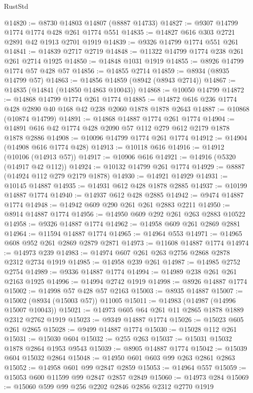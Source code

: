 \begin{lexlean}{RustStd}
\begin{coremodule}
@14820 := @8730 @14803 @14807 (@8887 @14733)
@14827 := @9307 @14799 @1774 @1774 @428 @261 @1774 @551
@14835 := @14827 @616 @303 @2721 @2891 @42 @1913 @2701 @1919
@14839 := @9326 @14799 @1774 @551 @261
@14841 := @14839 @2717 @2719
@14848 := @11322 @14799 @1774 @238 @261 @261 @2714 @1925
@14850 := @14848 @1031 @1919
@14855 := @8926 @14799 @1774 @57 @428 @57
@14856 := @14855 @2714
@14859 := @8934 (@8935 @14799 @57)
@14863 := @14856 @14859 (@8942 (@8943 @2714))
@14867 := @14835 (@14841 (@14850 @14863 @10043))
@14868 := @10050 @14799
@14872 := @14868 @14799 @1774 @261 @1774
@14885 := @14872 @616 @236 @1774 @428 @2890 @40 @168 @42 @238 @2060 @1878 @1878 @2643
@14887 := @10868 (@10874 @14799)
@14891 := @14868 @14887 @1774 @261 @1774
@14904 := @14891 @616 @42 @1774 @428 @2090 @57 @112 @279 @612 @2179 @1878 @1878 @2886
@14908 := @10096 @14799 @1774 @261 @1774
@14912 := @14904 (@14908 @616 @1774 @428)
@14913 := @10118 @616
@14916 := @14912 (@10106 (@14913 @57))
@14917 := @10906 @616
@14921 := @14916 (@5320 (@14917 @42 @112))
@14924 := @10132 @14799 @261 @1774
@14929 := @8887 (@14924 @112 @279 @2179 @1878)
@14930 := @14921 @14929
@14931 := @10145 @14887
@14935 := @14931 @612 @428 @1878 @2885
@14937 := @10199 @14887 @1774
@14940 := @14937 @612 @428 @2885
@14942 := @9474 @14887 @1774
@14948 := @14942 @609 @290 @261 @261 @2883 @2211
@14950 := @8914 @14887 @1774
@14956 := @14950 @609 @292 @261 @263 @2883 @10522
@14958 := @9326 @14887 @1774
@14962 := @14958 @609 @261 @2869 @2881
@14964 := @11594 @14887 @1774
@14965 := @14964 @553
@14971 := @14965 @608 @952 @261 @2869 @2879 @2871
@14973 := @11608 @14887 @1774
@14974 := @14973 @239
@14983 := @14974 @607 @261 @263 @2756 @2868 @2878 @2312 @2734 @1919
@14985 := @14958 @239 @261
@14987 := @14985 @2752 @2754
@14989 := @9336 @14887 @1774
@14994 := @14989 @238 @261 @261 @2163 @1925
@14996 := @14994 @2742 @1919
@14998 := @8926 @14887 @1774
@15002 := @14998 @57 @428 @57 @2163
@15003 := @8935 @14887
@15007 := @15002 (@8934 (@15003 @57)) @11005
@15011 := @14983 (@14987 (@14996 @15007 @10043))
@15021 := @14973 @605 @64 @261 @11 @2865 @1878 @1889 @2312 @2762 @1919
@15023 := @9349 @14887 @1774
@15026 := @15023 @605 @261 @2865
@15028 := @9499 @14887 @1774
@15030 := @15028 @112 @261
@15031 := @15030 @604
@15032 := @255 @263
@15037 := @15031 @15032 @1878 @2864 @1953 @9543
@15039 := @8905 @14887 @1774
@15042 := @15039 @604 @15032 @2864
@15048 := @14950 @601 @603 @99 @263 @2861 @2863
@15052 := @14958 @601 @99 @2847 @2859
@15053 := @14964 @557
@15059 := @15053 @600 @11599 @99 @2847 @2857 @2849
@15060 := @14973 @284
@15069 := @15060 @599 @99 @256 @2202 @2846 @2856 @2312 @2770 @1919

\end{coremodule}
\end{lexlean}
